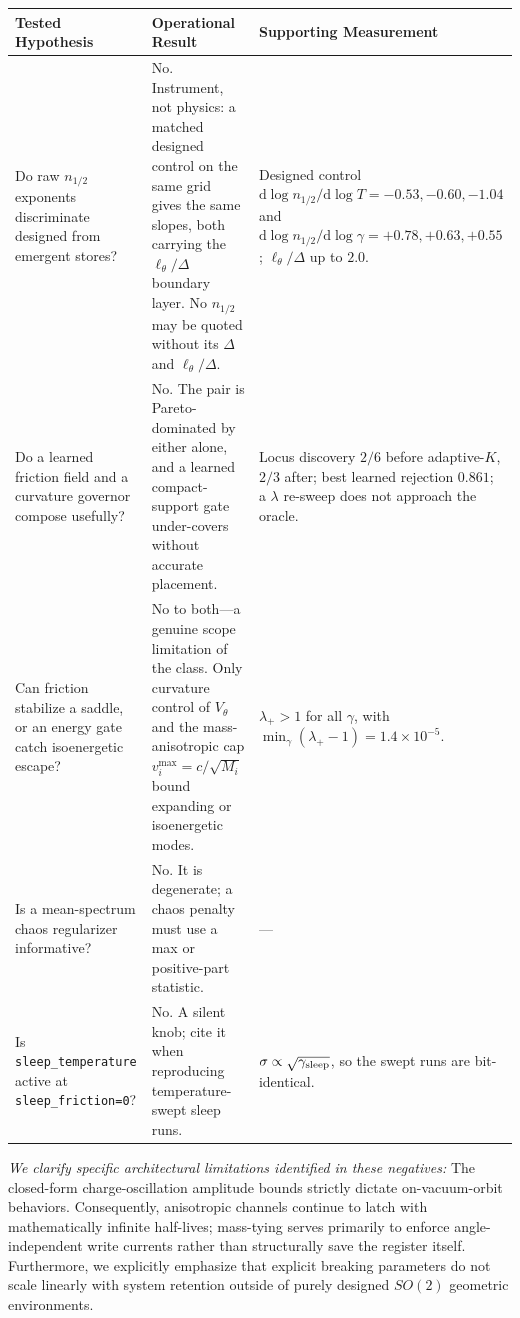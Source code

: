 \documentclass{article}
\begin{document}
\begin{center}
\begin{tabular}{@{}p{1.52in} p{1.52in} p{2.06in}@{}}
\toprule
Tested Hypothesis & Operational Result & Supporting Measurement \\
\midrule
Do raw $n_{1/2}$ exponents discriminate designed from emergent stores? &
No. Instrument, not physics: a matched designed control on the same grid gives the same slopes, both carrying the $\ell_\theta/\Delta$ boundary layer. No $n_{1/2}$ may be quoted without its $\Delta$ and $\ell_\theta/\Delta$. &
Designed control $\mathrm{d}\log n_{1/2}/\mathrm{d}\log T=-0.53,-0.60,-1.04$ and $\mathrm{d}\log n_{1/2}/\mathrm{d}\log\gamma=+0.78,+0.63,+0.55$; $\ell_\theta/\Delta$ up to $2.0$. \\[2pt]
Do a learned friction field and a curvature governor compose usefully? &
No. The pair is Pareto-dominated by either alone, and a learned compact-support gate under-covers without accurate placement. &
Locus discovery $2/6$ before adaptive-$K$, $2/3$ after; best learned rejection $0.861$; a $\lambda$ re-sweep does not approach the oracle. \\[2pt]
Can friction stabilize a saddle, or an energy gate catch isoenergetic escape? &
No to both---a genuine scope limitation of the class. Only curvature control of $V_\theta$ and the mass-anisotropic cap $v_i^{\max}=c/\sqrt{M_i}$ bound expanding or isoenergetic modes. &
$\lambda_+>1$ for all $\gamma$, with $\min_\gamma(\lambda_+-1)=1.4{\times}10^{-5}$. \\[2pt]
Is a mean-spectrum chaos regularizer informative? &
No. It is degenerate; a chaos penalty must use a max or positive-part statistic. &
--- \\[2pt]
Is \texttt{sleep\_temperature} active at \texttt{sleep\_friction=0}? &
No. A silent knob; cite it when reproducing temperature-swept sleep runs. &
$\sigma\propto\sqrt{\gamma_{\rm sleep}}$, so the swept runs are bit-identical. \\
\bottomrule
\end{tabular}
\end{center}

\emph{We clarify specific architectural limitations identified in these negatives:} The closed-form charge-oscillation amplitude bounds strictly dictate on-vacuum-orbit behaviors. Consequently, anisotropic channels continue to latch with mathematically infinite half-lives; mass-tying serves primarily to enforce angle-independent write currents rather than structurally save the register itself. Furthermore, we explicitly emphasize that explicit breaking parameters do not scale linearly with system retention outside of purely designed $SO(2)$ geometric environments.
\end{document}
